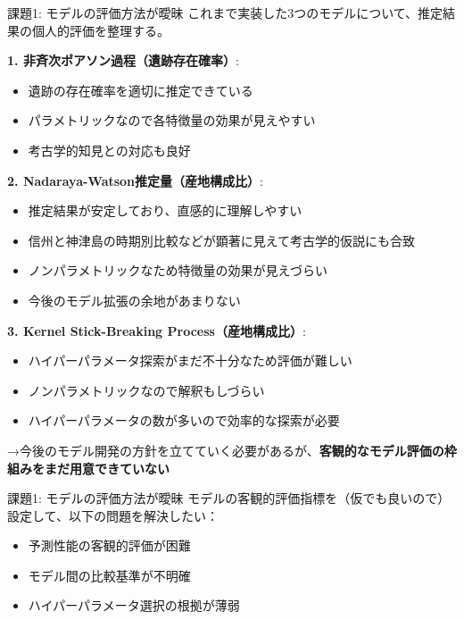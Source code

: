 \documentclass[xelatex, 8pt]{beamer}
\theoremstyle{plain}
\theoremstyle{definition}
\begin{document}
\begin{frame}{課題1: モデルの評価方法が曖昧}
    これまで実装した3つのモデルについて、推定結果の個人的評価を整理する。
    \vspace{3mm}

    \textbf{1. 非斉次ポアソン過程（遺跡存在確率）}:
    \begin{itemize}
        \item 遺跡の存在確率を適切に推定できている
        \item パラメトリックなので各特徴量の効果が見えやすい
        \item 考古学的知見との対応も良好
    \end{itemize}

    \textbf{2. Nadaraya-Watson推定量（産地構成比）}:
    \begin{itemize}
        \item 推定結果が安定しており、直感的に理解しやすい
        \item 信州と神津島の時期別比較などが顕著に見えて考古学的仮説にも合致
        \item ノンパラメトリックなため特徴量の効果が見えづらい
        \item 今後のモデル拡張の余地があまりない
    \end{itemize}

    \textbf{3. Kernel Stick-Breaking Process（産地構成比）}:
    \begin{itemize}
        \item ハイパーパラメータ探索がまだ不十分なため評価が難しい
        \item ノンパラメトリックなので解釈もしづらい
        \item ハイパーパラメータの数が多いので効率的な探索が必要
    \end{itemize}

    \vspace{3mm}
    →今後のモデル開発の方針を立てていく必要があるが、\textbf{客観的なモデル評価の枠組みをまだ用意できていない}

\end{frame}

\begin{frame}{課題1: モデルの評価方法が曖昧}
    モデルの客観的評価指標を（仮でも良いので）設定して、以下の問題を解決したい：

    \vspace{3mm}
    \begin{itemize}
        \item 予測性能の客観的評価が困難
        \item モデル間の比較基準が不明確
        \item ハイパーパラメータ選択の根拠が薄弱
    \end{itemize}

    \vspace{5mm}

\end{frame}
\end{document}
